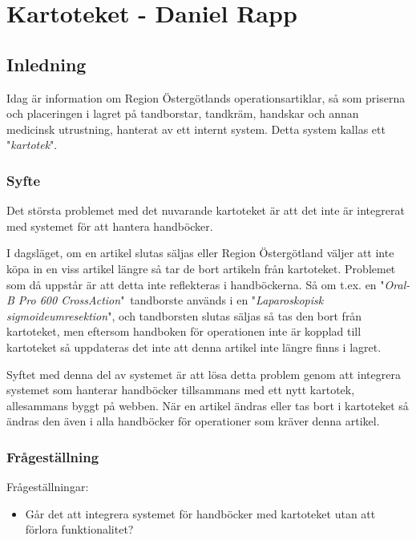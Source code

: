 \section{Kartoteket - Daniel Rapp}
\subsection{Inledning}
Idag är information om Region Östergötlands operationsartiklar, så som priserna och
placeringen i lagret på tandborstar, tandkräm, handskar och annan
medicinsk utrustning, hanterat av ett internt system.
Detta system kallas ett "\textit{kartotek}".


\subsubsection{Syfte}
Det största problemet med det nuvarande kartoteket är
att det inte är integrerat med systemet för att hantera handböcker.

I dagsläget, om en artikel slutas säljas eller Region Östergötland
väljer att inte köpa in en viss artikel längre så tar de bort artikeln
från kartoteket. Problemet som då uppstår är att detta inte reflekteras
i handböckerna. Så om t.ex. en "\textit{Oral-B Pro 600 CrossAction}"\ tandborste används i
en "\textit{Laparoskopisk sigmoideumresektion}", och tandborsten slutas säljas
så tas den bort från kartoteket, men eftersom handboken för operationen inte är
kopplad till kartoteket så uppdateras det inte att denna artikel inte längre finns
i lagret.

Syftet med denna del av systemet är att lösa detta problem genom att
integrera systemet som hanterar handböcker tillsammans med ett nytt kartotek,
allesammans byggt på webben. När en artikel ändras eller tas bort i kartoteket
så ändras den även i alla handböcker för operationer som kräver denna artikel.





\subsubsection{Frågeställning}
Frågeställningar:
\begin{itemize}
  \item Går det att integrera systemet för handböcker med kartoteket utan att förlora funktionalitet?
\end{itemize}


